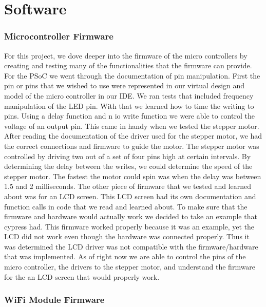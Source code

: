 \documentclass{article}
\begin{document}
\section*{Software}

\subsubsection*{Microcontroller Firmware}
\indent

For this project, we dove deeper into the firmware of the micro controllers by creating and testing many of the functionalities that the firmware can provide. For the PSoC we went through the documentation of pin manipulation. First the pin or pins that we wished to use were represented in our virtual design and model of the micro controller in our IDE. We ran tests that included frequency manipulation of the LED pin. With that we learned how to time the writing to pins. Using a delay function and n io write function we were able to control the voltage of an output pin. This came in handy when we tested the stepper motor. After reading the documentation of the driver used for the stepper motor, we had the correct connections and firmware to guide the motor. The stepper motor was controlled by driving two out of a set of four pins high at certain intervals. By determining the delay between the writes, we could determine the speed of the stepper motor. The fastest the motor could spin was when the delay was between 1.5 and 2 milliseconds. The other piece of firmware that we tested and learned about was for an LCD screen. This LCD screen had its own documentation and function calls in code that we read and learned about. To make sure that the firmware and hardware would actually work we decided to take an example that cypress had. This firmware worked properly because it was an example, yet the LCD did not work even though the hardware was connected properly. Thus it was determined the LCD driver was not compatible with the firmware/hardware that was implemented. As of right now we are able to control the pins of the micro controller, the drivers to the stepper motor, and understand the firmware for the an LCD screen that would properly work.

\subsubsection*{WiFi Module Firmware}
\indent
\end{document}
